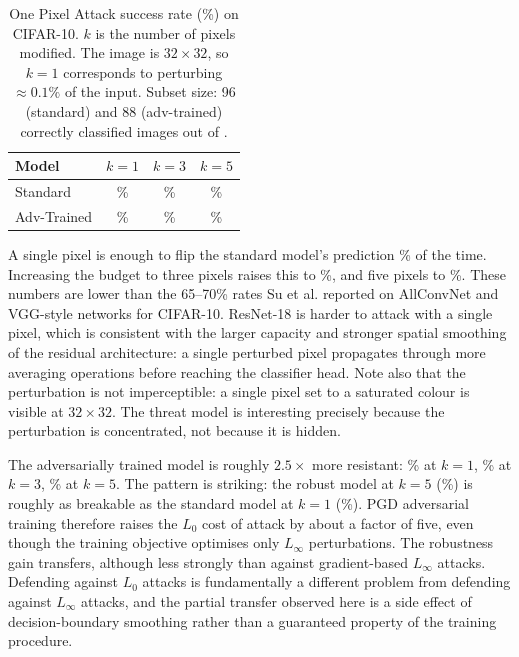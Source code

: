 \begin{table}[htbp]
    \centering
    \caption{One Pixel Attack success rate (\%) on CIFAR-10. $k$ is the number of pixels modified. The image is $32 \times 32$, so $k = 1$ corresponds to perturbing $\approx 0.1\%$ of the input. Subset size: 96 (standard) and 88 (adv-trained) correctly classified images out of \OPN{}.}
    \label{tab:onepixel_results}
    \begin{tabular}{lccc}
        \toprule
        \textbf{Model} & $k = 1$ & $k = 3$ & $k = 5$ \\
        \midrule
        Standard & \OPSA{}\% & \OPSB{}\% & \OPSC{}\% \\
        Adv-Trained & \OPRA{}\% & \OPRB{}\% & \OPRC{}\% \\
        \bottomrule
    \end{tabular}
\end{table}

A single pixel is enough to flip the standard model's prediction \OPSA{}\% of the time. Increasing the budget to three pixels raises this to \OPSB{}\%, and five pixels to \OPSC{}\%. These numbers are lower than the 65--70\% rates Su et al. reported on AllConvNet and VGG-style networks for CIFAR-10. ResNet-18 is harder to attack with a single pixel, which is consistent with the larger capacity and stronger spatial smoothing of the residual architecture: a single perturbed pixel propagates through more averaging operations before reaching the classifier head. Note also that the perturbation is not imperceptible: a single pixel set to a saturated colour is visible at $32 \times 32$. The threat model is interesting precisely because the perturbation is concentrated, not because it is hidden.

The adversarially trained model is roughly $2.5\times$ more resistant: \OPRA{}\% at $k = 1$, \OPRB{}\% at $k = 3$, \OPRC{}\% at $k = 5$. The pattern is striking: the robust model at $k = 5$ (\OPRC{}\%) is roughly as breakable as the standard model at $k = 1$ (\OPSA{}\%). PGD adversarial training therefore raises the $L_0$ cost of attack by about a factor of five, even though the training objective optimises only $L_\infty$ perturbations. The robustness gain transfers, although less strongly than against gradient-based $L_\infty$ attacks. Defending against $L_0$ attacks is fundamentally a different problem from defending against $L_\infty$ attacks, and the partial transfer observed here is a side effect of decision-boundary smoothing rather than a guaranteed property of the training procedure.

